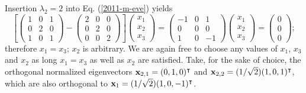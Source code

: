 {Insertion  $\lambda_2=2$ into Eq. (\ref{2011-m-eve}) yields
\begin{equation}
\left[
\begin{pmatrix}
1&0&1\\
0&2&0\\
1&0&1
\end{pmatrix}  -
\begin{pmatrix}
2&0&0\\
0&2&0\\
0&0&2
\end{pmatrix}
\right]
\begin{pmatrix}
x_1\\
x_2\\
x_3
\end{pmatrix}
=
\begin{pmatrix}
-1&0&1\\
0&0&0\\
1&0&-1
\end{pmatrix}
\begin{pmatrix}
x_1\\
x_2\\
x_3
\end{pmatrix}
=
\begin{pmatrix}
0\\
0\\
0
\end{pmatrix}
;
\end{equation}
therefore $x_1=x_3$; $x_2$ is arbitrary.
We are again free to choose any values of $x_1$, $x_3$ and $x_2$ as long
 $x_1=x_3$ as well as $x_2$ are satisfied.
Take, for the sake of choice, the orthogonal
normalized eigenvectors
${\bf x}_{2,1} = (0,1,0)^\intercal $ and
${\bf x}_{2,2} = (1/\sqrt{2})(1,0,1)^\intercal $,
which are also orthogonal to ${\bf x}_1 =(1/\sqrt{2})(1,0,-1)^\intercal $.

}
